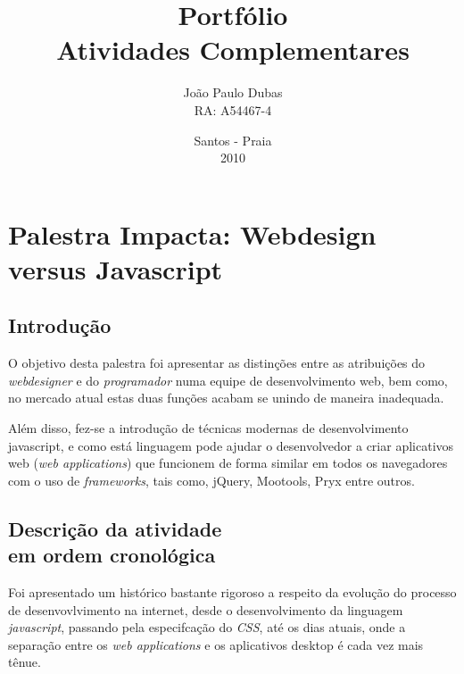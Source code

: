 \documentclass[a4paper]{report}
\begin{document}
    \title{Portf\'{o}lio\\Atividades Complementares}
    \author{Jo\~{a}o Paulo Dubas\\RA: A54467-4}
    \date{Santos - Praia\\2010}

    \maketitle

    \tableofcontents

    \chapter[Webdesign versus Javascript]{Palestra Impacta: Webdesign versus
    Javascript}

        \section{Introdu\c{c}\~{a}o}
        O objetivo desta palestra foi apresentar as distin\c{c}\~{o}es entre as
        atribui\c{c}\~{o}es do \emph{webdesigner} e do \emph{programador} numa
        equipe de desenvolvimento web, bem como, no mercado atual estas
        duas fun\c{c}\~{o}es acabam se unindo de maneira inadequada.

        Al\'{e}m disso, fez-se a introdu\c{c}\~{a}o de t\'{e}cnicas modernas de
        desenvolvimento javascript, e como est\'{a} linguagem pode ajudar
        o desenvolvedor a criar aplicativos web (\emph{web applications})
        que funcionem de forma similar em todos os navegadores com o
        uso de \emph{frameworks}, tais como, jQuery, Mootools, Pryx
        entre outros.

        \section[Descri\c{c}\~{a}o atividade]{Descri\c{c}\~{a}o da atividade
        \\em ordem cronol\'{o}gica}
        Foi apresentado um hist\'{o}rico bastante rigoroso a respeito da
        evolu\c{c}\~{a}o do processo de desenvovlvimento na internet, desde o
        desenvolvimento da linguagem \emph{javascript}, passando pela
        especifca\c{c}\~{a}o do \emph{CSS}, at\'{e} os dias atuais, onde a
        separa\c{c}\~{a}o entre os \emph{web applications} e os aplicativos
        desktop \'{e} cada vez mais t\^{e}nue.
\end{document}
